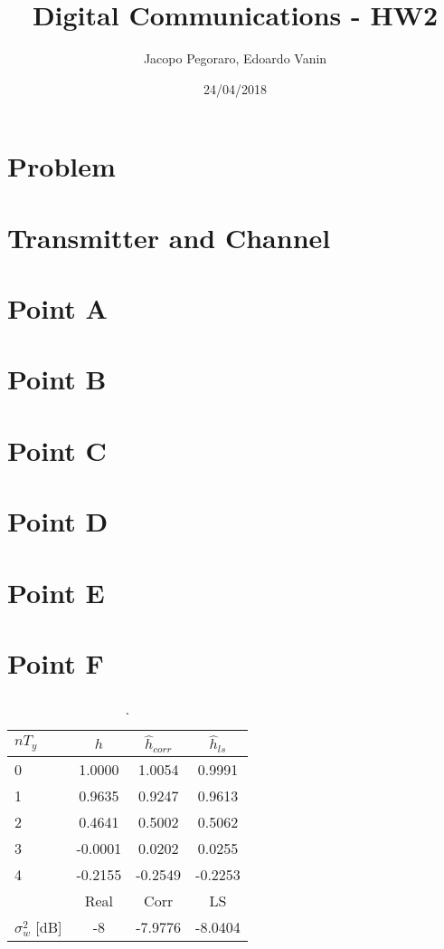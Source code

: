 \documentclass[a4paper,11.5pt]{article}
\title{Digital Communications - HW2}
\author{Jacopo Pegoraro, Edoardo Vanin}
\date{24/04/2018}
\begin{document}
\maketitle

\section*{Problem}

\section{Transmitter and Channel}

\section{Point A}

\section{Point B}
\section{Point C}
\section{Point D}
\section{Point E}
\section{Point F}


\begin{table}[htbp]
	\begin{center}
		\begin{tabular}{p{2.7cm}ccc}
			\toprule
			
			$nT_y$ & $h$ & $\hat{h}_{corr}$ & $\hat{h}_{ls}$\\
			\midrule
			0 & 1.0000  & 1.0054 & 0.9991  \\
			1 & 0.9635 & 0.9247 & 0.9613  \\
			2 & 0.4641 & 0.5002 & 0.5062 \\
			3 & -0.0001 & 0.0202 & 0.0255  \\
			4 & -0.2155 & -0.2549 & -0.2253\\
			\midrule
			& Real & Corr & LS \\
		    \cmidrule(lr){2-4}
		    $\sigma_w^2$ [dB] & -8 & -7.9776 & -8.0404  \\
			\bottomrule
		\end{tabular}
	\end{center}
	\label{tab:}
	\caption{.}
\end{table} 
\end{document}
